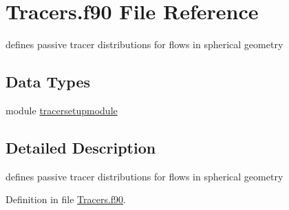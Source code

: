 \hypertarget{Tracers_8f90}{\section{Tracers.\+f90 File Reference}
\label{Tracers_8f90}
}


defines passive tracer distributions for flows in spherical geometry  


\subsection*{Data Types}
\begin{DoxyCompactItemize}
\item 
module \hyperlink{classtracersetupmodule}{tracersetupmodule}
\end{DoxyCompactItemize}


\subsection{Detailed Description}
defines passive tracer distributions for flows in spherical geometry 



Definition in file \hyperlink{Tracers_8f90_source}{Tracers.\+f90}.


